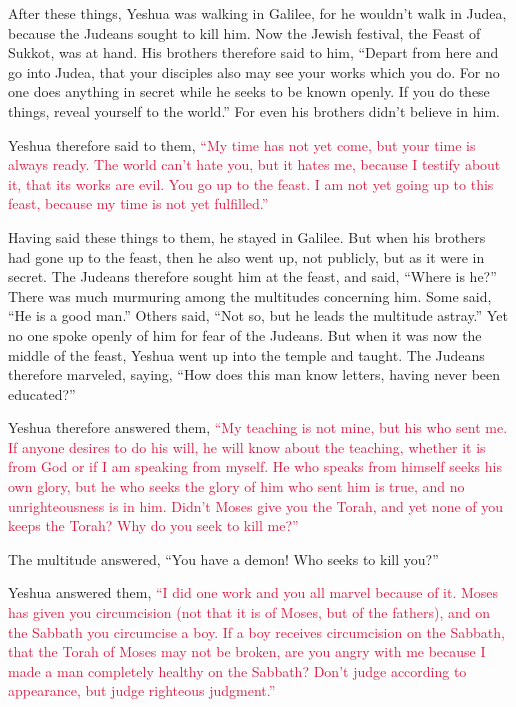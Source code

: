 \mychapter{} \myverse*{}After these things, Yeshua was walking in Galilee, for he wouldn’t
walk in Judea, because the Judeans sought to kill him.
\myverse{}Now the Jewish festival, the Feast of Sukkot, was at hand.
\myverse{}His brothers therefore said to him, “Depart from here and go into Judea, that
your disciples also may see your works which you do.
\myverse{}For no one does anything in secret while he seeks to be known openly. If you
do these things, reveal yourself to the world.”
\myverse{}For even his brothers didn’t believe in him.

\myverse{}Yeshua therefore said to them,
\textcolor{crimson}{“My time has not yet come, but your time is always ready.
}
\myverse{}\textcolor{crimson}{The world can’t hate you, but it hates me, because I testify about it, that
	its works are evil.
}
\myverse{}\textcolor{crimson}{You go up to the feast. I am not yet going up to this feast, because my
	time is not yet fulfilled.”}

\myverse{}Having said these things to them, he stayed in Galilee.
\myverse{}But when his brothers had gone up to the feast, then he also went up, not
publicly, but as it were in secret.
\myverse{}The Judeans therefore sought him at the feast, and said, “Where is he?”
\myverse{}There was much murmuring among the multitudes concerning him. Some said, “He
is a good man.” Others said, “Not so, but he leads the multitude astray.”
\myverse{}Yet no one spoke openly of him for fear of the Judeans.
\myverse{}But when it was now the middle of the feast, Yeshua went up into the temple
and taught.
\myverse{}The Judeans therefore marveled, saying, “How does this man know letters, having
never been educated?”

\myverse{}Yeshua therefore answered them,
\textcolor{crimson}{“My teaching is not mine, but his who sent me.
}
\myverse{}\textcolor{crimson}{If anyone desires to do his will, he will know about the teaching, whether
	it is from God or if I am speaking from myself.
}
\myverse{}\textcolor{crimson}{He who speaks from himself seeks his own glory, but he who seeks the glory
	of him who sent him is true, and no unrighteousness is in him.
}
\myverse{}\textcolor{crimson}{Didn’t Moses give you the Torah, and yet none of you keeps the Torah?
	Why do you seek to kill me?”}

\myverse{}The multitude answered, “You have a demon! Who seeks to kill
you?”

\myverse{}Yeshua answered them,
\textcolor{crimson}{“I did one work and you all marvel because of it.
}
\myverse{}\textcolor{crimson}{Moses has given you circumcision (not that it is of Moses, but of the
	fathers), and on the Sabbath you circumcise a boy.
}
\myverse{}\textcolor{crimson}{If a boy receives circumcision on the Sabbath, that the Torah of Moses
	may not be broken, are you angry with me because I made a man completely healthy on the Sabbath?
}
\myverse{}\textcolor{crimson}{Don’t judge according to appearance, but judge righteous judgment.”
}

